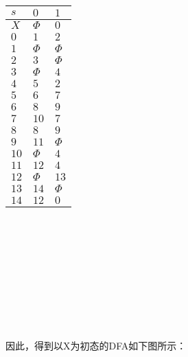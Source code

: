 \documentclass{article}
\begin{document}
\begin{table}[h!]
    \centering
\begin{tabular}{|p{3cm}<{\centering}|p{3cm}<{\centering}|p{3cm}<{\centering}|}   
    \hline
    $s$ & $0$ & $1$ \\
    \hline
    $X$ & $\Phi$ & $0$ \\
    \hline
    $0$ & $1$ & $2$ \\
    \hline
    $1$ & $\Phi$ & $\Phi$ \\
    \hline
    $2$ & $3$ & $\Phi$ \\
    \hline
    $3$ & $\Phi$ & $4$ \\
    \hline
    $4$ & $5$ & $2$ \\
    \hline
    $5$ & $6$ & $7$ \\
    \hline
    $6$ & $8$ & $9$ \\
    \hline
    $7$ & $10$ & $7$ \\
    \hline
    $8$ & $8$ & $9$ \\
    \hline
    $9$ & $11$ & $\Phi$ \\
    \hline
    $10$ & $\Phi$ & $4$ \\
    \hline
    $11$ & $12$ & $4$ \\
    \hline
    $12$ & $\Phi$ & $13$ \\
    \hline
    $13$ & $14$ & $\Phi$ \\
    \hline
    $14$ & $12$ & $0$ \\
    \hline
\end{tabular}
\end{table}
\ \\ \\ \\ \\ \\ \\ \\ \\ \\
因此，得到以X为初态的DFA如下图所示：
\end{document}
